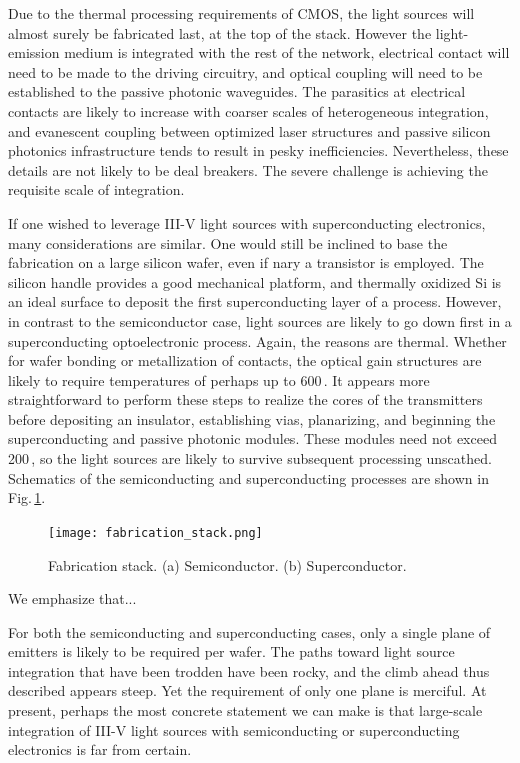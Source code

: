 \documentclass[twocolumn]{article}
\begin{document}
Due to the thermal processing requirements of CMOS, the light sources will almost surely be fabricated last, at the top of the stack. However the light-emission medium is integrated with the rest of the network, electrical contact will need to be made to the driving circuitry, and optical coupling will need to be established to the passive photonic waveguides. The parasitics at electrical contacts are likely to increase with coarser scales of heterogeneous integration, and evanescent coupling between optimized laser structures and passive silicon photonics infrastructure tends to result in pesky inefficiencies. Nevertheless, these details are not likely to be deal breakers. The severe challenge is achieving the requisite scale of integration.

If one wished to leverage III-V light sources with superconducting electronics, many considerations are similar. One would still be inclined to base the fabrication on a large silicon wafer, even if nary a transistor is employed. The silicon handle provides a good mechanical platform, and thermally oxidized Si is an ideal surface to deposit the first superconducting layer of a process. However, in contrast to the semiconductor case, light sources are likely to go down first in a superconducting optoelectronic process. Again, the reasons are thermal. Whether for wafer bonding or metallization of contacts, the optical gain structures are likely to require temperatures of perhaps up to 600\,\textcelsius. It appears more straightforward to perform these steps to realize the cores of the transmitters before depositing an insulator, establishing vias, planarizing, and beginning the superconducting and passive photonic modules. These modules need not exceed 200\,\textcelsius, so the light sources are likely to survive subsequent processing unscathed. Schematics of the semiconducting and superconducting processes are shown in Fig.\,\ref{fig:fabrication_stack}.
\begin{figure}
    \centering
    \texttt{[image: fabrication\_stack.png]}
    \caption{Fabrication stack. (a) Semiconductor. (b) Superconductor.}
    \label{fig:fabrication_stack}
\end{figure}
We emphasize that...

For both the semiconducting and superconducting cases, only a single plane of emitters is likely to be required per wafer. The paths toward light source integration that have been trodden have been rocky, and the climb ahead thus described appears steep. Yet the requirement of only one plane is merciful. At present, perhaps the most concrete statement we can make is that large-scale integration of III-V light sources with semiconducting or superconducting electronics is far from certain. 
\end{document}
